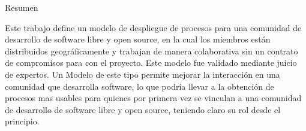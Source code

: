 
\begin{prologo}{Resumen}      

Este trabajo define un modelo de despliegue de procesos para una comunidad de desarrollo de software libre y open source, en la cual los miembros están distribuidos geográficamente y trabajan de manera colaborativa sin un contrato de compromisos para con el proyecto. Este modelo fue validado mediante juicio de expertos. 
Un Modelo de este tipo permite mejorar la interacción en una comunidad que desarrolla software, lo que podría  llevar a  la obtención de procesos mas usables para quienes por primera vez se vinculan a una comunidad de desarrollo de software libre y open source, teniendo claro su rol desde el principio. 


\end{prologo}

